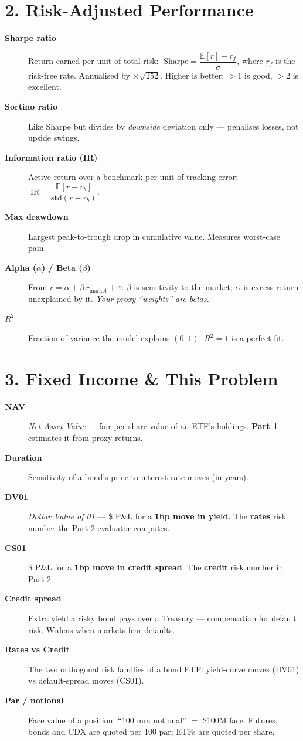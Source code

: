 \documentclass[10pt]{article}
\newcommand{\term}[1]{\textcolor{term}{\textbf{#1}}}
\begin{document}
\section{2. Risk-Adjusted Performance}
\begin{description}
\item[\term{Sharpe ratio}] Return earned per unit of total risk:
$\;\mathrm{Sharpe} = \dfrac{\mathbb{E}[r] - r_f}{\sigma}$, where $r_f$ is the risk-free rate.
Annualised by $\times\sqrt{252}$. Higher is better; $>1$ is good, $>2$ is excellent.
\item[\term{Sortino ratio}] Like Sharpe but divides by \emph{downside} deviation only — penalises
losses, not upside swings.
\item[\term{Information ratio (IR)}] Active return over a benchmark per unit of tracking error:
$\;\mathrm{IR} = \dfrac{\mathbb{E}[r - r_b]}{\mathrm{std}(r - r_b)}$.
\item[\term{Max drawdown}] Largest peak-to-trough drop in cumulative value. Measures worst-case pain.
\item[\term{Alpha ($\alpha$) / Beta ($\beta$)}] From $r = \alpha + \beta\, r_{\text{market}} + \varepsilon$:
$\beta$ is sensitivity to the market; $\alpha$ is excess return unexplained by it. \emph{Your proxy
``weights'' are betas.}
\item[\term{$R^2$}] Fraction of variance the model explains $(0\text{--}1)$. $R^2=1$ is a perfect fit.
\end{description}

\section{3. Fixed Income \& This Problem}
\begin{description}
\item[\term{NAV}] \emph{Net Asset Value} — fair per-share value of an ETF's holdings. \textbf{Part 1}
estimates it from proxy returns.
\item[\term{Duration}] Sensitivity of a bond's price to interest-rate moves (in years).
\item[\term{DV01}] \emph{Dollar Value of 01} — \$ P\&L for a \textbf{1bp move in yield}. The \textbf{rates}
risk number the Part-2 evaluator computes.
\item[\term{CS01}] \$ P\&L for a \textbf{1bp move in credit spread}. The \textbf{credit} risk number in Part 2.
\item[\term{Credit spread}] Extra yield a risky bond pays over a Treasury — compensation for default risk.
Widens when markets fear defaults.
\item[\term{Rates vs Credit}] The two orthogonal risk families of a bond ETF: yield-curve moves (DV01)
vs default-spread moves (CS01).
\item[\term{Par / notional}] Face value of a position. ``100 mm notional'' $=$ \$100M face. Futures, bonds
and CDX are quoted per 100 par; ETFs are quoted per share.
\end{description}
\end{document}
